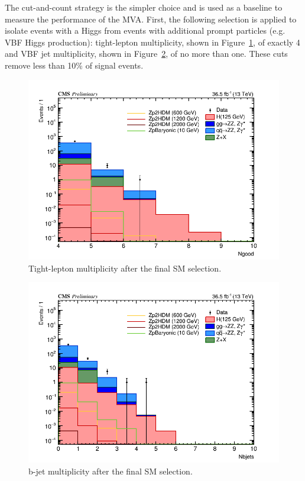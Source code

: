 The cut-and-count strategy is the simpler choice and is used as a baseline to measure the performance of the MVA. First, the following selection is applied to isolate events with a Higgs from events with additional prompt particles (e.g. VBF Higgs production): tight-lepton multiplicity, shown in Figure~\ref{fig:ngood}, of exactly 4 and VBF jet multiplicity, shown in Figure~\ref{fig:nbjets}, of no more than one. These cuts remove less than 10\% of signal events.

\begin{figure}[tbh]
\centering
\includegraphics[width=5.5in]{figures/hist_hNgood_CR.png}
    \caption{Tight-lepton multiplicity after the final SM selection.}
    \label{fig:ngood}
\end{figure}

\begin{figure}[tbh]
\centering
\includegraphics[width=5.5in]{figures/hist_hNbjets_CR.png}
    \caption{b-jet multiplicity after the final SM selection.}
    \label{fig:nbjets}
\end{figure}

